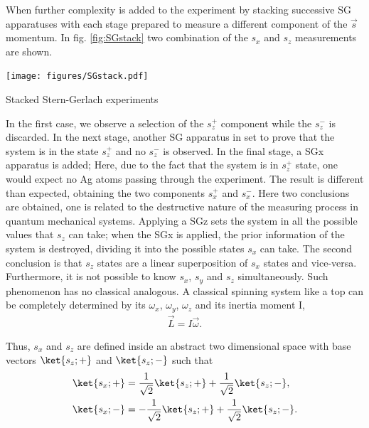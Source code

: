 \documentclass{article}
\begin{document}
When further complexity is added to the experiment by stacking successive SG apparatuses with each stage prepared to measure a different component of the $\vec{s}$ momentum. In fig. \ref{fig:SGstack} two combination of the $s_x$ and $s_z$ measurements are shown.
\begin{marginfigure}%
  \begin{centering}
  \texttt{[image: figures/SGstack.pdf]}
  \caption{Stacked Stern-Gerlach experiments}
  \label{fig:SGstack}
  \end{centering}
\end{marginfigure}
In the first case, we observe a selection of the $s_z ^+$ component while the $s_z ^-$ is discarded. In the next stage, another SG apparatus in set to prove that the system is in the state $s_z ^+$ and no $s_z ^-$ is observed. In the final stage, a SGx apparatus is added; Here, due to the fact that the system is in $s_z ^+$ state, one would expect no Ag atoms passing through the experiment. The result is different than expected, obtaining the two components $s_x ^+$ and $s_x ^-$.
Here two conclusions are obtained, one is related to the destructive nature of the measuring process in quantum mechanical systems. Applying a SGz sets the system in all the possible values that $s_z$ can take; when the SGx is applied, the prior information of the system is destroyed, dividing it into the possible states $s_x$ can take. The second conclusion is that $s_z$ states are a linear superposition of $s_x$ states and vice-versa. Furthermore, it is not possible to know $s_x$, $s_y$ and $s_z$ simultaneously. Such phenomenon has no classical analogous. A classical spinning system like a top can be completely determined by its $\omega_x$, $\omega_y$, $\omega_z$ and its inertia moment I,
\begin{align}\label{eq:angularmom}
  \vec{L} = I\vec{\omega}.
\end{align}

Thus, $s_x$ and $s_z$ are defined inside an abstract two dimensional space with base vectors $\ket{s_z;+}$ and $\ket{s_z;-}$ such that
\begin{align}\label{eq:superposition}
  \ket{s_x;+}&=\frac{1}{\sqrt{2}}\ket{s_z;+}+\frac{1}{\sqrt{2}}\ket{s_z;-},\\
  \ket{s_x;-}&=-\frac{1}{\sqrt{2}}\ket{s_z;+}+\frac{1}{\sqrt{2}}\ket{s_z;-}.
\end{align}
\end{document}
